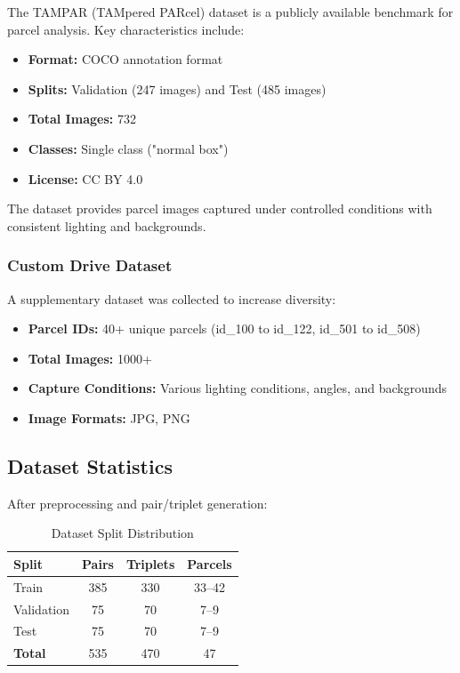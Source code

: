 \documentclass[12pt,a4paper]{article}
\begin{document}
The TAMPAR (TAMpered PARcel) dataset is a publicly available benchmark for parcel analysis. Key characteristics include:

\begin{itemize}
    \item \textbf{Format:} COCO annotation format
    \item \textbf{Splits:} Validation (247 images) and Test (485 images)
    \item \textbf{Total Images:} 732
    \item \textbf{Classes:} Single class ("normal box")
    \item \textbf{License:} CC BY 4.0
\end{itemize}

The dataset provides parcel images captured under controlled conditions with consistent lighting and backgrounds.

\subsubsection{Custom Drive Dataset}

A supplementary dataset was collected to increase diversity:

\begin{itemize}
    \item \textbf{Parcel IDs:} 40+ unique parcels (id\_100 to id\_122, id\_501 to id\_508)
    \item \textbf{Total Images:} 1000+
    \item \textbf{Capture Conditions:} Various lighting conditions, angles, and backgrounds
    \item \textbf{Image Formats:} JPG, PNG
\end{itemize}

\subsection{Dataset Statistics}

After preprocessing and pair/triplet generation:

\begin{table}[H]
\centering
\caption{Dataset Split Distribution}
\label{tab:dataset_splits}
\begin{tabular}{lccc}
\toprule
\textbf{Split} & \textbf{Pairs} & \textbf{Triplets} & \textbf{Parcels} \\
\midrule
Train & 385 & 330 & 33--42 \\
Validation & 75 & 70 & 7--9 \\
Test & 75 & 70 & 7--9 \\
\midrule
\textbf{Total} & 535 & 470 & 47 \\
\bottomrule
\end{tabular}
\end{table}
\end{document}
